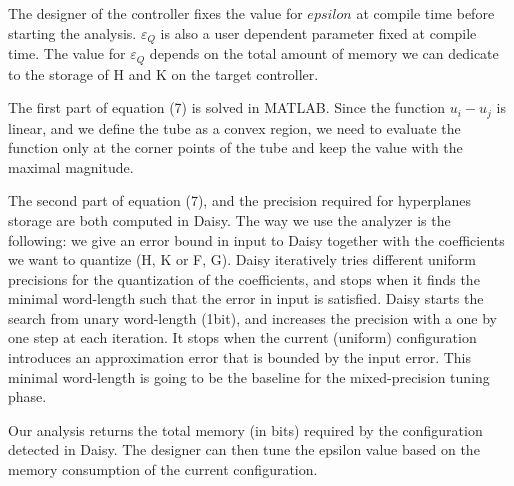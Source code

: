 The designer of the controller fixes the value for $epsilon$ at compile time before starting the analysis. $\varepsilon_{Q}$ is also a user dependent parameter fixed at compile time. The value for $\varepsilon_{Q}$ depends on the total amount of memory we can dedicate to the storage of H and K on the target controller.

The first part of equation (7) is solved in MATLAB. Since the function $u_{i}-u_{j}$ is linear, and we define the tube as a convex region, we need to evaluate the function only at the corner points of the tube and keep the value with the maximal magnitude.

The second part of equation (7), and the precision required for hyperplanes storage are both computed in Daisy. 
The way we use the analyzer is the following: we give an error bound in input to Daisy together with the coefficients we want to quantize (H, K or F, G). Daisy iteratively tries different uniform precisions for the quantization of the coefficients, and stops when it finds the minimal word-length such that the error in input is satisfied.
Daisy starts the search from unary word-length (1bit), and increases the precision with a one by one step at each iteration. It stops when the current (uniform) configuration introduces an approximation error that is bounded by the input error. This minimal word-length is going to be the baseline for the mixed-precision tuning phase.

Our analysis returns the total memory (in bits) required by the configuration detected in Daisy. The designer can then tune the epsilon value based on the memory consumption of the current configuration. 